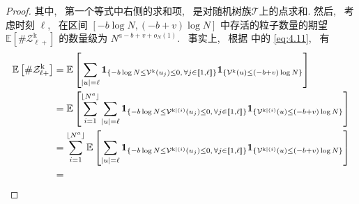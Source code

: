\begin{proof}
{    }{
        其中,~ 第一个等式中右侧的求和项,~ 是对随机树族$\boldsymbol{\mathcal T}$上的点求和.
        然后,~ 考虑时刻 $\ell$,~ 在区间 $[-b\log N, (-b+v)\log N]$ 中存活的粒子数量的期望 $\mathbb E[\#\mathcal Z^{\mathrm{k}}_{\ell+}]$ 的数量级为 $N^{a-b+v+o_N(1)}$.~ 事实上,~ 根据 中的 \eqref{eq:4.11},~ 有
    }
    \begin{align*}
        \mathbb E\left[\#\mathcal Z^{\mathrm{k}}_{\ell+}\right]
        &
        =
        \mathbb E\left[
            \sum_{|u|=\ell}
            {\bf 1}_{
                \{
                    -b\log N
                    \le
                    \mathcal V^{\mathrm{k}}(u_j)
                    \le
                    0,\,
                    \forall j\in[\![1,\ell]\!]
                \}
            }
            {\bf 1}_{
                \{
                    \mathcal V^{\mathrm{k}}(u)
                    \le
                    (-b+v)\log N
                \}
            }
        \right]
        \\
        &
        =
        \mathbb E\left[
            \sum_{i=1}^{\lfloor N^a\rfloor}
            \sum_{|u|=\ell}
            {\bf 1}_{
                \{
                    -b\log N
                    \le
                    \mathcal V^{\mathrm{k}|(i)}(u_j)
                    \le
                    0,\,
                    \forall j\in[\![1,\ell]\!]
                \}
            }
            {\bf 1}_{
                \{
                    \mathcal V^{\mathrm{k}|(i)}(u)
                    \le
                    (-b+v)\log N
                \}
            }
        \right]
        \\
        &
        =
        \sum_{i=1}^{\lfloor N^a\rfloor}
        \mathbb E\left[
            \sum_{|u|=\ell}
            {\bf 1}_{
                \{
                    -b\log N
                    \le
                    \mathcal V^{\mathrm{k}|(i)}(u_j)
                    \le
                    0,\,
                    \forall j\in[\![1,\ell]\!]
                \}
            }
            {\bf 1}_{
                \{
                    \mathcal V^{\mathrm{k}|(i)}(u)
                    \le
                    (-b+v)\log N
                \}
            }
        \right]
        \\
        &
        =

\end{align*}
\end{proof}
